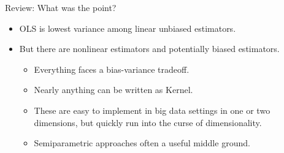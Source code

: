 \begin{frame}{Review: What was the point?}
  \begin{itemize}
  \item OLS is lowest variance among linear unbiased estimators.
  \item But there are \alert{nonlinear} estimators and potentially \alert{biased} estimators.
  \begin{itemize}
  \item Everything faces a \alert{bias-variance} tradeoff.
  \item Nearly anything can be written as Kernel.
  \item These are easy to implement in big data settings in one or two dimensions, but quickly run into the curse of dimensionality.
  \item Semiparametric approaches often a useful middle ground.
  \end{itemize}
  \end{itemize}

\end{frame}

\begin{frame}[allowframebreaks]
  
  
\end{frame}



%



